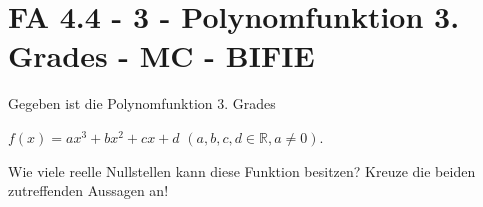 \section{FA 4.4 - 3 - Polynomfunktion 3. Grades - MC - BIFIE}

\begin{beispiel}[FA 4.4]{1} %
				Gegeben ist die Polynomfunktion 3. Grades \begin{center}
	$f(x)=ax^3+bx^2+cx+d$ $(a,b,c,d\in\mathbb{R},a\neq0)$.\end{center}
	
Wie viele reelle Nullstellen kann diese Funktion besitzen? Kreuze die beiden zutreffenden Aussagen an!

\end{beispiel}
